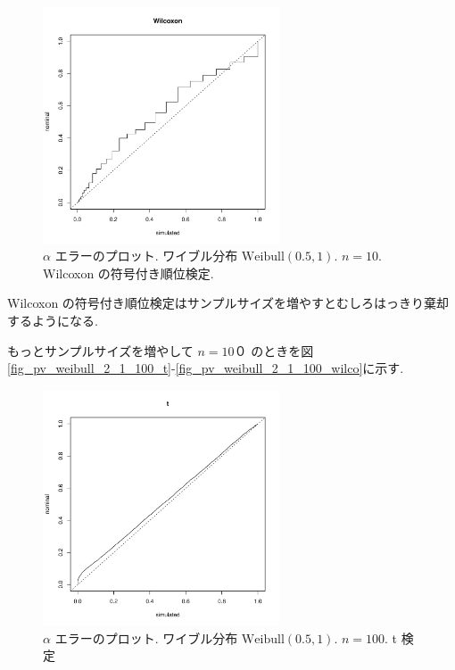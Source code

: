 \documentclass[12pt]{jsarticle}
\begin{document}
 \begin{figure}[htbp]
 \begin{center}
  \includegraphics[width=70mm]{img/pv_weibull_05_1_n10_wilco.pdf}
 \end{center}
       \caption{$\alpha$ エラーのプロット. ワイブル分布 $\mathrm{Weibull}(0.5,1)$. $n=10$. Wilcoxon の符号付き順位検定.}
  \label{fig_pv_weibull_05_1_10_wilco}
\end{figure}

Wilcoxon の符号付き順位検定はサンプルサイズを増やすとむしろはっきり棄却するようになる.

もっとサンプルサイズを増やして $n=10０$ のときを図\ref{fig_pv_weibull_2_1_100_t}-\ref{fig_pv_weibull_2_1_100_wilco}に示す. 

\begin{figure}[htbp]
  \begin{center}
\includegraphics[width=70mm]{img/pv_weibull_05_1_n100_t.pdf}
  \end{center}
     \caption{$\alpha$ エラーのプロット. ワイブル分布 $\mathrm{Weibull}(0.5,1)$. $n=100$. t 検定}
  \label{fig_pv_weibull_05_1_100_t}
 \end{figure}
 
\end{document}
